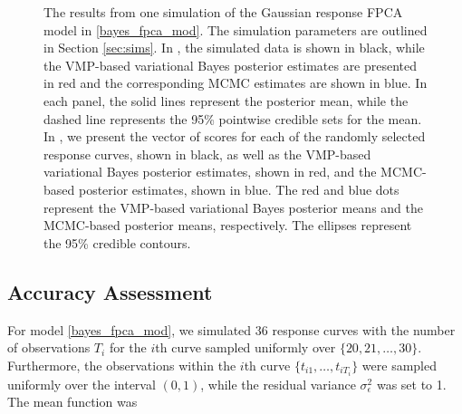 \documentclass[12pt]{article}
\def\sigsqeps{\sigma^2_{\epsilon}}
\theoremstyle{plain}
\theoremstyle{definition}
\theoremstyle{remark}
\begin{document}
\begin{figure}[t!]
\centering
\tabskip=0pt
\caption{
	The results from one simulation of the Gaussian response FPCA model in \eqref{bayes_fpca_mod}. The
	simulation parameters are outlined in Section \ref{sec:sims}.
	In , the simulated data is shown in black, while the VMP-based
	variational Bayes posterior estimates are presented in red and the corresponding MCMC estimates
	are shown in blue. In each panel, the solid lines represent
	the posterior mean, while the dashed line represents the 95\% pointwise credible sets for the mean.
	In , we present the vector of scores for each of the
	randomly selected response curves,
	shown in black, as well as the VMP-based variational Bayes posterior estimates, shown in red, and the
	MCMC-based posterior estimates, shown in blue. The red and blue dots represent the VMP-based
	variational Bayes posterior means and the MCMC-based posterior means, respectively.
	The ellipses represent the 95\% credible contours.
}
\label{fig:gauss_resp_sim}
\end{figure}


\subsection{Accuracy Assessment}
\label{sec:acc_ass}

For model \eqref{bayes_fpca_mod}, we simulated 36 response curves with the number
of observations $T_i$ for the $i$th curve sampled uniformly over $\{ 20, 21, \dots, 30 \}$. Furthermore, the
observations within the $i$th curve $\{ t_{i1}, \dots, t_{i T_i} \}$ were sampled uniformly over the interval $(0, 1)$,
while the residual variance $\sigsqeps$ was set to 1. The mean function was
\end{document}
